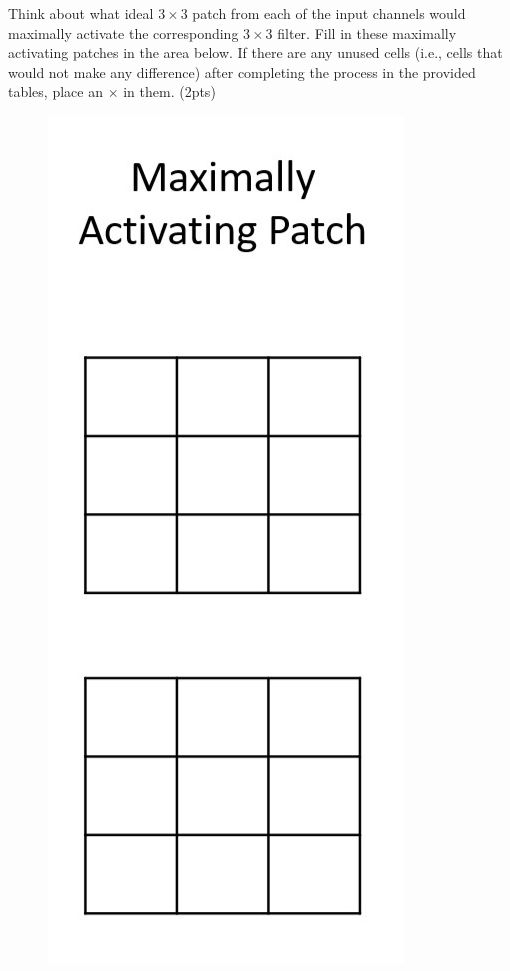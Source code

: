 Think about what ideal $3\times3$ patch from each of the input channels would maximally activate the corresponding $3\times3$ filter. Fill in these maximally activating patches in the area below. If there are any unused cells (i.e., cells that would not make any difference) after completing the process in the provided tables, place an $\times$ in them. (2pts)

\begin{figure}[H]
	\centering
	\includegraphics[width=.12\linewidth]{images/conv_question_blanks_2.png}
\end{figure}

